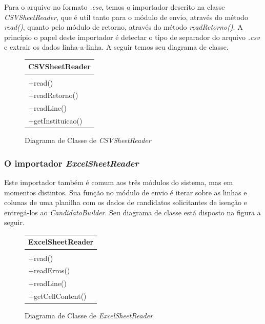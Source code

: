 \documentclass[
	12pt,			%
	openright,		%
	oneside,	
	a4paper,		%
	english,		%
	brazil			%
]{abntex2/abntex2}  %
\begin{document}
					Para o arquivo no formato \textit{.csv}, temos o importador descrito na classe \textit{CSVSheetReader}, que é util tanto para o módulo de envio, através do método \textit{read()}, quanto pelo módulo de retorno, através do método \textit{readRetorno()}. A princípio o papel deste importador é detectar o tipo de separador do arquivo \textit{.csv} e extrair os dados linha-a-linha. A seguir temos seu diagrama de classe.
	
					\begin{figure}[H]
						\begin{center}
							
							\caption{Diagrama de Classe de \textit{CSVSheetReader}}
							\label{csvreader-uml}
							
							\begin{tabular}{|l|}
								\hline
								\multicolumn{1}{|c|}{\textbf{CSVSheetReader}} \\ \hline
								\\ \hline
								+read() \\
								+readRetorno() \\
								+readLine() \\
								+getInstituicao() \\ \hline
							\end{tabular}
							
						\end{center}
					\end{figure}
	
				\subsubsection{O importador \textit{ExcelSheetReader}}

					Este importador também é comum aos três módulos do sistema, mas em momentos distintos. Sua função no módulo de envio é iterar sobre as linhas e colunas de uma planilha com os dados de candidatos solicitantes de isenção e entregá-los ao \textit{CandidatoBuilder}. Seu diagrama de classe está disposto na figura a seguir.

					\begin{figure}[h]
						\begin{center}
							
							\caption{Diagrama de Classe de \textit{ExcelSheetReader}}
							\label{excelreader-uml}
							
							\begin{tabular}{|l|}
								\hline
								\multicolumn{1}{|c|}{\textbf{ExcelSheetReader}} \\ \hline
								\\ \hline
								+read() \\
								+readErros() \\
								+readLine() \\
								+getCellContent() \\ \hline
							\end{tabular}
							
						\end{center}
					\end{figure}
	
\end{document}
